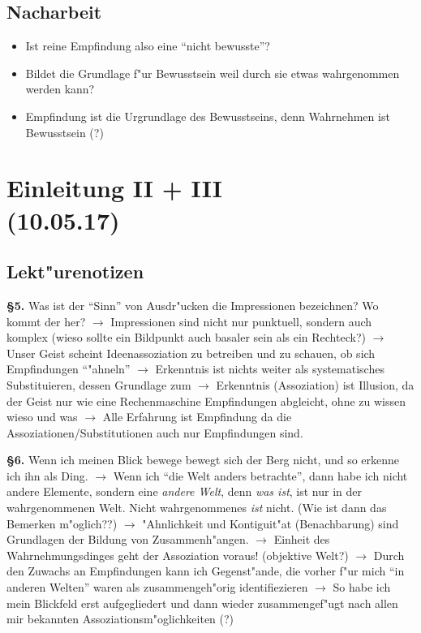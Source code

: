 \documentclass[emulatestandardclasses]{scrartcl}
\begin{document}
\subsection{Nacharbeit}

\begin{itemize}
  \item Ist reine Empfindung also eine "`nicht bewusste"'?
  \item Bildet die Grundlage f"ur Bewusstsein weil durch sie etwas wahrgenommen werden kann?
  \item Empfindung ist die Urgrundlage des Bewusstseins, denn Wahrnehmen ist Bewusstsein (?)
\end{itemize}


\section{Einleitung II + III\\(10.05.17)}

\subsection{Lekt"urenotizen}


\textbf{\S 5.} Was ist der "`Sinn"' von Ausdr"ucken die Impressionen bezeichnen? Wo kommt der her? $\rightarrow$ Impressionen sind nicht nur punktuell, sondern auch komplex (wieso sollte ein Bildpunkt auch basaler sein als ein Rechteck?) $\rightarrow$ Unser Geist scheint Ideenassoziation zu betreiben und zu schauen, ob sich Empfindungen "`"ahneln"' $\rightarrow$ Erkenntnis ist nichts weiter als systematisches Substituieren, dessen Grundlage zum $\rightarrow$ Erkenntnis (Assoziation) ist Illusion, da der Geist nur wie eine Rechenmaschine Empfindungen abgleicht, ohne zu wissen wieso und was $\rightarrow$ Alle Erfahrung ist Empfindung da die Assoziationen/Substitutionen auch nur Empfindungen sind.\newline

\textbf{\S 6.} Wenn ich meinen Blick bewege bewegt sich der Berg nicht, und so erkenne ich ihn als Ding. $\rightarrow$ Wenn ich "`die Welt anders betrachte"', dann habe ich nicht andere Elemente, sondern eine \emph{andere Welt}, denn \emph{was ist}, ist nur in der wahrgenommenen Welt. Nicht wahrgenommenes \emph{ist} nicht. (Wie ist dann das Bemerken m"oglich??) $\rightarrow$ "Ahnlichkeit und Kontiguit"at (Benachbarung) sind Grundlagen der Bildung von Zusammenh"angen. $\rightarrow$ Einheit des Wahrnehmungsdinges geht der Assoziation voraus! (objektive Welt?) $\rightarrow$ Durch den Zuwachs an Empfindungen kann ich Gegenst"ande, die vorher f"ur mich "`in anderen Welten"' waren als zusammengeh"orig identifiezieren $\rightarrow$ So habe ich mein Blickfeld erst aufgegliedert und dann wieder zusammengef"ugt nach allen mir bekannten Assoziationsm"oglichkeiten (?)\newline
\end{document}
